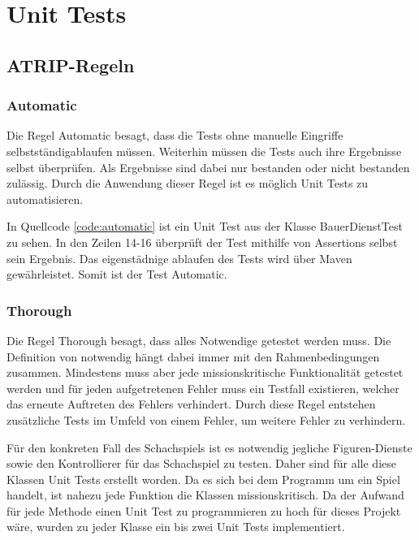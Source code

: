 \chapter{Unit Tests}

\section{ATRIP-Regeln}

\subsection{Automatic}
Die Regel \glqq{}Automatic\grqq{} besagt, dass die Tests ohne manuelle Eingriffe selbstständigablaufen müssen. Weiterhin müssen die Tests auch ihre Ergebnisse selbst überprüfen. Als Ergebnisse sind dabei nur \glqq{}bestanden\grqq{} oder \glqq{}nicht bestanden\grqq{} zulässig. Durch die Anwendung dieser Regel ist es möglich Unit Tests zu automatisieren.



In Quellcode \ref{code:automatic} ist ein Unit Test aus der Klasse BauerDienstTest zu sehen. In den Zeilen 14-16 überprüft der Test mithilfe von Assertions selbst sein Ergebnis. Das eigenstädnige ablaufen des Tests wird über Maven gewährleistet. Somit ist der Test Automatic.

\subsection{Thorough}
Die Regel \glqq{}Thorough\grqq{} besagt, dass alles Notwendige getestet werden muss. Die Definition von notwendig hängt dabei immer mit den Rahmenbedingungen zusammen. Mindestens muss aber jede missionskritische Funktionalität getestet werden und für jeden aufgetretenen Fehler muss ein Testfall existieren, welcher das erneute Auftreten des Fehlers verhindert. Durch diese Regel entstehen zusätzliche Tests im Umfeld von einem Fehler, um weitere Fehler zu verhindern.

Für den konkreten Fall des Schachspiels ist es notwendig jegliche Figuren-Dienste sowie den Kontrollierer für das Schachspiel zu testen. Daher sind für alle diese Klassen Unit Tests erstellt worden. Da es sich bei dem Programm um ein Spiel handelt, ist nahezu jede Funktion die Klassen missionskritisch. Da der Aufwand für jede Methode einen Unit Test zu programmieren zu hoch für dieses Projekt wäre, wurden zu jeder Klasse ein bis zwei Unit Tests implementiert.

